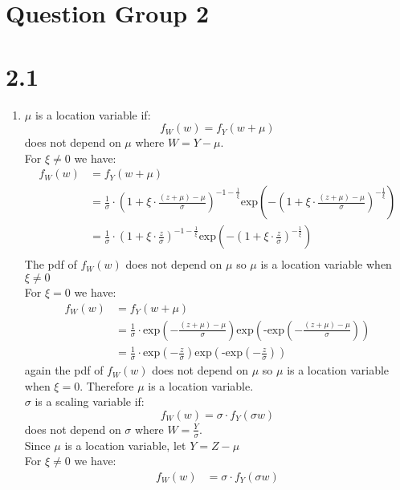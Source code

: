 \documentclass{article}
\begin{document}
\section*{Question Group 2}
\section*{2.1}
\begin{enumerate}
\item $\mu$ is a location variable if: \\
\[
f_W(w) = f_Y(w + \mu)
\]
does not depend on $\mu$ where $W = Y - \mu$. \\
For $\xi \neq 0$ we have: \\
\begin{align*}
f_W(w) &= f_Y(w + \mu) \\
&= \frac{1}{\sigma} \cdot (1 + \xi \cdot \frac{(z + \mu) - \mu}{\sigma})^{-1 - \frac{1}{\xi}}\mbox{exp}(-(1 + \xi \cdot \frac{(z + \mu) - \mu}{\sigma})^{-\frac{1}{\xi}}) \\
&= \frac{1}{\sigma} \cdot (1 + \xi \cdot \frac{z}{\sigma})^{-1 - \frac{1}{\xi}}\mbox{exp}(-(1 + \xi \cdot \frac{z}{\sigma})^{-\frac{1}{\xi}}) \\
\end{align*}
The pdf of $f_W(w)$ does not depend on $\mu$ so $\mu$ is a location variable when $\xi \neq 0$ \\
For $\xi = 0$ we have: \\
\begin{align*}
f_W(w) &= f_Y(w + \mu) \\
&= \frac{1}{\sigma} \cdot \mbox{exp}(-\frac{(z + \mu) - \mu}{\sigma})\mbox{exp}(\mbox{-exp}(-\frac{(z + \mu) - \mu}{\sigma})) \\
&= \frac{1}{\sigma} \cdot \mbox{exp}(-\frac{z}{\sigma})\mbox{exp}(\mbox{-exp}(-\frac{z}{\sigma}))
\end{align*}
again the pdf of $f_W(w)$ does not depend on $\mu$ so $\mu$ is a location variable when $\xi = 0$. Therefore $\mu$ is a location variable. \\
$\sigma$ is a scaling variable if: \\
\[
f_W(w) = \sigma \cdot f_Y(\sigma w)
\]
does not depend on $\sigma$ where $W = \frac{Y}{\sigma}$. \\
Since $\mu$ is a location variable, let $Y = Z - \mu$ \\
For $\xi \neq 0$ we have: \\
\begin{align*}
f_W(w) &= \sigma \cdot f_Y(\sigma w) \\

\end{align*}
\end{enumerate}
\end{document}
